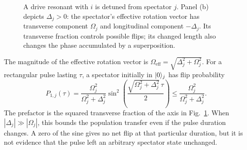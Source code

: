\begin{figure}[htbp]
 \centering
 \caption{A drive resonant with \(i\) is detuned from spectator
 \(j\). Panel (b) depicts \(\Delta_j>0\): the spectator's
 effective rotation vector has transverse component
 \(\Omega_j\) and longitudinal component \(-\Delta_j\).
 Its transverse fraction controls possible flips; its changed
 length also changes the phase accumulated by a superposition.}
 \label{fig:processor-spectator-axis}
\end{figure}
\FloatBarrier

The magnitude of the effective rotation vector is
\(\Omega_{\mathrm{eff}}=\sqrt{\Delta_j^2+\Omega_j^2}\).
For a rectangular pulse lasting \(\tau\), a spectator
initially in \(\lvert 0\rangle_j\) has flip probability
\begin{equation}
 P_{1,j}(\tau)=
 \frac{\Omega_j^2}{\Omega_j^2+\Delta_j^2}
 \sin^2\!\left(
   \frac{\sqrt{\Omega_j^2+\Delta_j^2}\,\tau}{2}\right)
 \leq\frac{\Omega_j^2}{\Omega_j^2+\Delta_j^2}.
 \label{eq:processor-off-resonant-response}
\end{equation}
The prefactor is the squared transverse fraction of
the axis in Fig.~\ref{fig:processor-spectator-axis}.
When \(|\Delta_j|\gg|\Omega_j|\), this bounds the
population transfer even if the pulse duration changes.
A zero of the sine gives no net flip at that particular
duration, but it is not evidence that the pulse left an
arbitrary spectator state unchanged.

